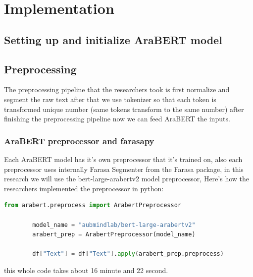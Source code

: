 \documentclass[12pt]{diazessay}
\begin{document}
    \section{Implementation }
    
    \subsection{Setting up and initialize AraBERT model}
    \subsection{Preprocessing}
    The preprocessing pipeline that the researchers took is first normalize and segment the raw text after that we use tokenizer so that each token is transformed unique number (same tokens transform to the same number) after finishing the preprocessing pipeline now we can feed AraBERT the inputs.
        \subsubsection{AraBERT preprocessor and farasapy}
        Each AraBERT  model has it's own preprocessor that it's trained on, also each preprocessor uses internally Farasa Segmenter from the Farasa package, in this research we will use the bert-large-arabertv2 model preprocessor, Here's how the researchers implemented the preprocessor in python:
        \begin{lstlisting}[language=Python]
        from arabert.preprocess import ArabertPreprocessor
        
        model_name = "aubmindlab/bert-large-arabertv2"
        arabert_prep = ArabertPreprocessor(model_name)
        
        df["Text"] = df["Text"].apply(arabert_prep.preprocess)
        \end{lstlisting}
        this whole code takes about 16 minute and 22 second.
\end{document}
